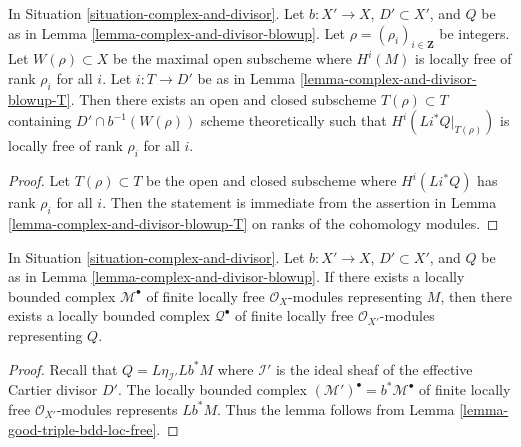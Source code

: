 \begin{lemma}
\label{lemma-complex-and-divisor-blowup-T-ranks}
In Situation \ref{situation-complex-and-divisor}. Let $b : X' \to X$,
$D' \subset X'$, and $Q$ be as in
Lemma \ref{lemma-complex-and-divisor-blowup}.
Let $\rho = (\rho_i)_{i \in \mathbf{Z}}$ be integers.
Let $W(\rho) \subset X$ be the maximal open subscheme where
$H^i(M)$ is locally free of rank $\rho_i$ for all $i$.
Let $i : T \to D'$ be as in Lemma \ref{lemma-complex-and-divisor-blowup-T}.
Then there exists an open and closed subscheme $T(\rho) \subset T$
containing $D' \cap b^{-1}(W(\rho))$ scheme theoretically
such that $H^i(Li^*Q|_{T(\rho)})$ is locally free of rank $\rho_i$
for all $i$.
\end{lemma}

\begin{proof}
Let $T(\rho) \subset T$ be the open and closed subscheme
where $H^i(Li^*Q)$ has rank $\rho_i$ for all $i$. Then the statement
is immediate from the assertion in
Lemma \ref{lemma-complex-and-divisor-blowup-T}
on ranks of the cohomology modules.
\end{proof}

\begin{lemma}
\label{lemma-complex-and-divisor-blowup-T-represented-bdd-loc-free}
In Situation \ref{situation-complex-and-divisor}. Let $b : X' \to X$,
$D' \subset X'$, and $Q$ be as in
Lemma \ref{lemma-complex-and-divisor-blowup}.
If there exists a locally bounded complex $\mathcal{M}^\bullet$
of finite locally free $\mathcal{O}_X$-modules representing $M$,
then there exists a locally bounded complex $\mathcal{Q}^\bullet$
of finite locally free $\mathcal{O}_{X'}$-modules representing $Q$.
\end{lemma}

\begin{proof}
Recall that $Q = L\eta_{\mathcal{I}'}Lb^*M$ where $\mathcal{I}'$ is the
ideal sheaf of the effective Cartier divisor $D'$.
The locally bounded complex
$(\mathcal{M}')^\bullet = b^*\mathcal{M}^\bullet$ of
finite locally free $\mathcal{O}_{X'}$-modules
represents $Lb^*M$. Thus the lemma follows from
Lemma \ref{lemma-good-triple-bdd-loc-free}.
\end{proof}

